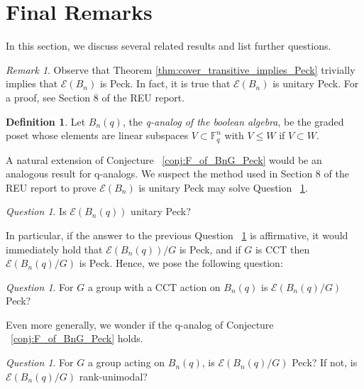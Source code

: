 \documentclass[smallextended, envcountsame, numbook]{svjour3}
\theoremstyle{plain}
\theoremstyle{definition}
\newtheorem{defn}[thm]{Definition}
\theoremstyle{remark}
\newtheorem{rmk}[thm]{Remark}
\newtheorem{que}[thm]{Question}
\numberwithin{equation}{section}
\begin{document}
\section{Final Remarks}

In this section, we discuss several related results and list further questions. 

\begin{rmk}
Observe that Theorem \ref{thm:cover_transitive_implies_Peck} trivially implies that $\mathcal E(B_n)$ is Peck. In fact, it is true that $\mathcal E(B_n)$ is unitary Peck. For a proof, see Section 8 of the REU report.
\end{rmk}

\begin{defn}
Let $B_n(q)$, the {\it q-analog of the boolean algebra}, be the graded poset whose elements are linear subspaces $V \subset \mathbb F_q^n$ with $V \leq W$ if $V \subset W$.
\end{defn}

A natural extension of Conjecture ~\ref{conj:F_of_BnG_Peck} would be an analogous result for q-analogs. We suspect the method used in Section 8 of the REU report to prove $\mathcal E(B_n)$ is unitary Peck may solve Question ~\ref{question:unitary_peck_q_edge}.

\begin{que}
\label{question:unitary_peck_q_edge}
Is $\mathcal E(B_n(q))$ unitary Peck?
\end{que}


In particular, if the answer to the previous Question ~\ref{question:unitary_peck_q_edge} is affirmative, it would immediately hold that $\mathcal E(B_n(q))/G$ is Peck, and if $G$ is CCT then $\mathcal E(B_n(q)/G)$ is Peck. Hence, we pose the following question: 

\begin{que}
For $G$ a group with a CCT action on $B_n(q)$ is $\mathcal E(B_n(q)/G)$ Peck?
\end{que}

Even more generally, we wonder if the q-analog of Conjecture ~\ref{conj:F_of_BnG_Peck} holds.

\begin{que}
For $G$ a group acting on $B_n(q)$, is $\mathcal E(B_n(q)/G)$ Peck? If not, is $\mathcal E(B_n(q)/G)$ rank-unimodal?
\end{que}
\end{document}
